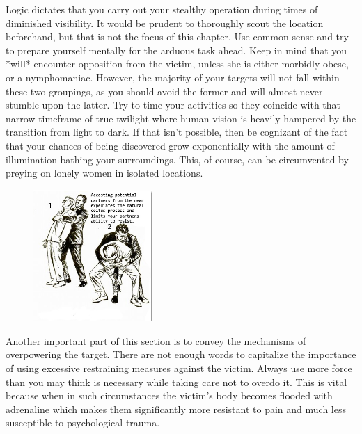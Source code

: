 Logic dictates that you carry out your stealthy operation during times of diminished visibility. It would
be prudent to thoroughly scout the location beforehand, but that is not the focus of this chapter. Use common
sense and try to prepare yourself mentally for the arduous task ahead. Keep in mind that you *will* encounter
opposition from the victim, unless she is either morbidly obese, or a nymphomaniac. However, the majority of
your targets will not fall within these two groupings, as you should avoid the former and will almost never
stumble upon the latter. Try to time your activities so they coincide with that narrow timeframe of true
twilight where human vision is heavily hampered by the transition from light to dark. If that isn't
possible, then be cognizant of the fact that your chances of being discovered grow exponentially
with the amount of illumination bathing your surroundings. This, of course, can be circumvented
by preying on lonely women in isolated locations.

\begin{figure}
\includegraphics[width=0.4\textwidth]{images/surprise.jpg}
\end{figure}

Another important part of this section is to convey the mechanisms of overpowering the target. There are not
enough words to capitalize the importance of using excessive restraining measures against the victim. Always
use more force than you may think is necessary while taking care not to overdo it. This is vital because when in
such circumstances the victim's body becomes flooded with adrenaline which makes them significantly more resistant to
pain and much less susceptible to psychological trauma.

